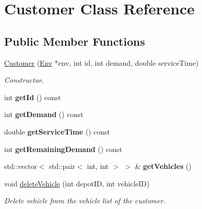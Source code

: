 \hypertarget{class_customer}{}\section{Customer Class Reference}
\label{class_customer}
\subsection*{Public Member Functions}
\begin{DoxyCompactItemize}
\item 
\hyperlink{class_customer_aaa83636312ec0431684c8d898a21ad69}{Customer} (\hyperlink{class_env}{Env} $\ast$env, int id, int demand, double service\+Time)
\begin{DoxyCompactList}\small\item\em Constructor. \end{DoxyCompactList}\item 
\mbox{\label{class_customer_acdbe83bbd49996e9a3b62820433b6f5d}} 
int {\bfseries get\+Id} () const
\item 
\mbox{\label{class_customer_ac1714e36409416fd737d426f14c1781a}} 
int {\bfseries get\+Demand} () const
\item 
\mbox{\label{class_customer_aa9c2a49942a8c7de055ee902e5e72127}} 
double {\bfseries get\+Service\+Time} () const
\item 
\mbox{\label{class_customer_ab7ab4f52f6fd1ced79b7cecdde4675ec}} 
int {\bfseries get\+Remaining\+Demand} () const
\item 
\mbox{\label{class_customer_ad01e6465075cfdb95bd42999d5330bdf}} 
std\+::vector$<$ std\+::pair$<$ int, int $>$ $>$ \& {\bfseries get\+Vehicles} ()
\item 
void \hyperlink{class_customer_ac4d2860ec8491a4ae65f467d9c52ca27}{delete\+Vehicle} (int depot\+ID, int vehicle\+ID)
\begin{DoxyCompactList}\small\item\em Delete vehicle from the vehicle list of the customer. \end{DoxyCompactList}\item 
\mbox{\label{class_customer_a2c3f4f6dcfdb9445493385b2cdca524e}} 

\end{DoxyCompactItemize}

